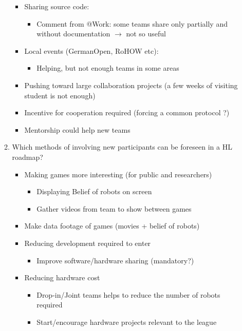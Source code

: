 \documentclass{article}
\begin{document}
\begin{enumerate}
\begin{enumerate}
\begin{itemize}
\begin{itemize}
       \end{itemize}
           \item Sharing source code:
           \begin{itemize} 
               \item Comment from @Work: some teams share only partially and without documentation $\rightarrow$ not so useful
       \end{itemize}
           \item Local events (GermanOpen, RoHOW etc):
           \begin{itemize} 
               \item Helping, but not enough teams in some areas
       \end{itemize}
           \item Pushing toward large collaboration projects (a few weeks of visiting student is not enough)
           \item Incentive for cooperation required (forcing a common protocol ?)
           \item Mentorship could help new teams
   \end{itemize}
       \item Which methods of involving new participants can be foreseen in a HL roadmap?
       \begin{itemize} 
           \item Making games more interesting (for public and researchers)
           \begin{itemize} 
               \item Displaying Belief of robots on screen
               \item Gather videos from team to show between games
       \end{itemize}
           \item Make data footage of games (movies + belief of robots)
           \item Reducing development required to enter
           \begin{itemize} 
               \item Improve software/hardware sharing (mandatory?)
       \end{itemize}
           \item Reducing hardware cost
           \begin{itemize} 
               \item Drop-in/Joint teams helps to reduce the number of robots required
               \item Start/encourage hardware projects relevant to the league

\end{itemize}
\end{itemize}
\end{enumerate}
\end{enumerate}
\end{document}
